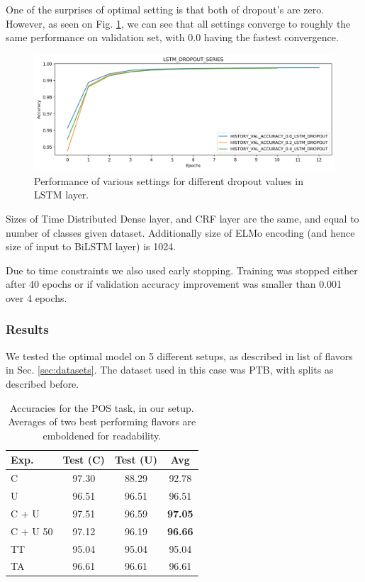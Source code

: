 \documentclass[11pt,a4paper]{article}
\begin{document}
    One of the surprises of optimal setting is that both of dropout's are zero. However, as seen on Fig. \ref{fig:pos-hyperdrop}, we can see that all settings converge to roughly the same performance on validation set, with $0.0$ having the fastest convergence.

    \begin{figure}[h]
        \centering
    	\includegraphics[scale=0.3]{pos_hypersearch_drop.png}
        \caption{Performance of various settings for different dropout values in LSTM layer.}
        \label{fig:pos-hyperdrop}
    \end{figure}

    Sizes of Time Distributed Dense layer, and CRF layer are the same, and equal to number of classes given dataset. Additionally size of ELMo encoding (and hence size of input to BiLSTM layer) is 1024.

    Due to time constraints we also used early stopping. Training was stopped either after 40 epochs or if validation accuracy improvement was smaller than 0.001 over 4 epochs.

    \subsubsection{Results}
    We tested the optimal model on 5 different setups, as described in list of flavors in Sec. \ref{sec:datasets}. The dataset used in this case was PTB, with splits as described before.

    \begin{table}[h]
        \centering
        \begin{tabular}{|l|c|c|c|}
            \hline
            Exp. & Test (C) & Test (U) & Avg \\
            \hline
            C        & 97.30 & 88.29 & 92.78 \\
            U        & 96.51 & 96.51 & 96.51 \\
            C + U    & 97.51 & 96.59 & \textbf{97.05} \\
            C + U 50 & 97.12 & 96.19 & \textbf{96.66} \\
            TT       & 95.04 & 95.04 & 95.04 \\
            TA       & 96.61 & 96.61 & 96.61 \\
            \hline
        \end{tabular}
        \caption{Accuracies for the POS task, in our setup. Averages of two best performing flavors are emboldened for readability.}
        \label{tab:pos-results-our}
    \end{table}
\end{document}

